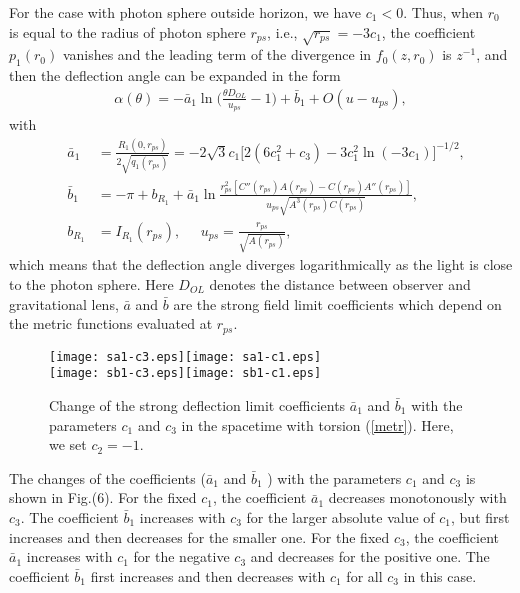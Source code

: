 \documentclass[aps,showpacs,preprintnumbers,amsmath,amssymb]{revtex4}
\begin{document}
For the case with photon sphere outside horizon, we have $c_1<0$. Thus, when $r_0$ is equal to the radius of photon sphere $r_{ps}$, i.e., $\sqrt{r_{ps}}=-3c_1$, the
coefficient $p_1(r_0)$ vanishes and the leading term of the
divergence in $f_0(z,r_0)$ is $z^{-1}$, and then the deflection angle can be
expanded in the form \cite{VB1}
\begin{eqnarray}
\alpha(\theta)=-\bar{a}_1\ln{\bigg(\frac{\theta
D_{OL}}{u_{ps}}-1\bigg)}+\bar{b}_1+O(u-u_{ps}),
\end{eqnarray}
with
\begin{eqnarray}
&\bar{a}_1&=\frac{R_1(0,r_{ps})}{2\sqrt{q_1(r_{ps})}}=
-2\sqrt{3}c_1\bigg[2(6c^2_1+c_3)-3c^2_1\ln(-3c_1)\bigg]^{-1/2}, \nonumber\\
&\bar{b}_1&=
-\pi+b_{R_1}+\bar{a}_1\ln{\frac{r^2_{ps}[C''(r_{ps})A(r_{ps})-C(r_{ps})A''(r_{ps})]}{u_{ps}
\sqrt{A^3(r_{ps})C(r_{ps})}}}, \nonumber\\
&b_{R_1}&=I_{R_1}(r_{ps}), \;\;\;\;\;u_{ps}=\frac{r_{ps}}{\sqrt{A(r_{ps})}},
\end{eqnarray}
which means that the deflection angle
diverges logarithmically as the light is close to the photon sphere. Here
$D_{OL}$ denotes the distance between observer and gravitational
lens, $\bar{a}$ and $\bar{b}$ are the strong field limit
coefficients which depend on the metric functions evaluated at
$r_{ps}$.
\begin{figure}[ht]\label{pas10}
\begin{center}
\texttt{[image: sa1-c3.eps]}\texttt{[image: sa1-c1.eps]}\\
\texttt{[image: sb1-c3.eps]}\texttt{[image: sb1-c1.eps]}
\caption{Change of the strong deflection limit coefficients $\bar{a}_1$ and $\bar{b}_1$ with the parameters $c_1$ and $c_3$ in the spacetime with torsion (\ref{metr}). Here, we set $c_2=-1$.}
\end{center}
\end{figure}
The changes of the coefficients ($\bar{a}_1$ and $\bar{b}_1$ ) with the parameters $c_1$ and $c_3$ is shown in Fig.(6). For the fixed $c_1$, the coefficient $\bar{a}_1$ decreases monotonously with $c_3$. The coefficient $\bar{b}_1$ increases with $c_3$ for the larger absolute value of $c_1$, but first increases and then decreases for the smaller one. For the fixed $c_3$, the coefficient $\bar{a}_1$ increases with $c_1$ for the negative $c_3$ and decreases for the positive one. The coefficient $\bar{b}_1$ first increases and then decreases
with $c_1$ for all $c_3$ in this case.
\end{document}
